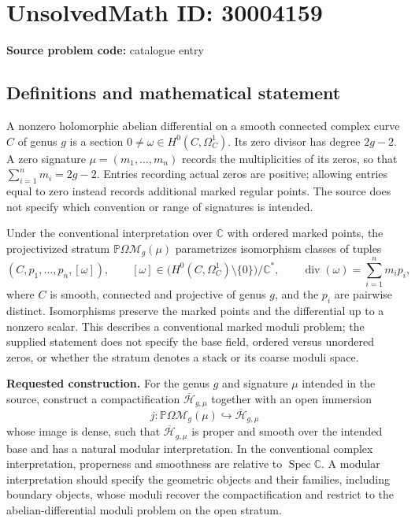 \documentclass[11pt]{article}
\newcommand{\C}{\mathbb{C}}
\begin{document}
\section*{UnsolvedMath ID: 30004159}
\textbf{Source problem code:} catalogue entry
\subsection{Definitions and mathematical statement}
A nonzero holomorphic abelian differential on a smooth connected complex curve \(C\) of genus \(g\) is a section \(0\ne\omega\in H^0(C,\Omega_C^1)\). Its zero divisor has degree \(2g-2\). A zero signature \(\mu=(m_1,\ldots,m_n)\) records the multiplicities of its zeros, so that \(\sum_{i=1}^n m_i=2g-2\). Entries recording actual zeros are positive; allowing entries equal to zero instead records additional marked regular points. The source does not specify which convention or range of signatures is intended.

Under the conventional interpretation over \(\C\) with ordered marked points, the projectivized stratum \(\mathbb P\Omega\mathcal M_g(\mu)\) parametrizes isomorphism classes of tuples
\[
(C,p_1,\ldots,p_n,[\omega]),\qquad
[\omega]\in\bigl(H^0(C,\Omega_C^1)\setminus\{0\}\bigr)/\C^*,
\qquad
\operatorname{div}(\omega)=\sum_{i=1}^n m_i p_i,
\]
where \(C\) is smooth, connected and projective of genus \(g\), and the \(p_i\) are pairwise distinct. Isomorphisms preserve the marked points and the differential up to a nonzero scalar. This describes a conventional marked moduli problem; the supplied statement does not specify the base field, ordered versus unordered zeros, or whether the stratum denotes a stack or its coarse moduli space.

\textbf{Requested construction.} For the genus \(g\) and signature \(\mu\) intended in the source, construct a compactification \(\overline{\mathcal H}_{g,\mu}\) together with an open immersion
\[
j:\mathbb P\Omega\mathcal M_g(\mu)\hookrightarrow\overline{\mathcal H}_{g,\mu}
\]
whose image is dense, such that \(\overline{\mathcal H}_{g,\mu}\) is proper and smooth over the intended base and has a natural modular interpretation. In the conventional complex interpretation, properness and smoothness are relative to \(\operatorname{Spec}\C\). A modular interpretation should specify the geometric objects and their families, including boundary objects, whose moduli recover the compactification and restrict to the abelian-differential moduli problem on the open stratum.
\end{document}
